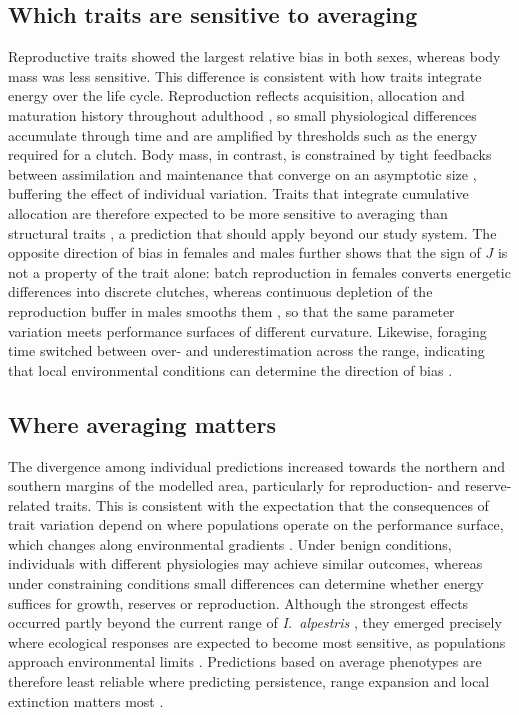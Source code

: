 \documentclass[12pt]{article}
\begin{document}
\subsection*{Which traits are sensitive to averaging}

Reproductive traits showed the largest relative bias in both sexes, whereas body mass was less sensitive. This difference is consistent with how traits integrate energy over the life cycle. Reproduction reflects acquisition, allocation and maturation history throughout adulthood \parencite{kooijman2010,jusup2017}, so small physiological differences accumulate through time and are amplified by thresholds such as the energy required for a clutch. Body mass, in contrast, is constrained by tight feedbacks between assimilation and maintenance that converge on an asymptotic size \parencite{nisbet2012,lika2019}, buffering the effect of individual variation. Traits that integrate cumulative allocation are therefore expected to be more sensitive to averaging than structural traits \parencite{nisbet2012,palmer2024}, a prediction that should apply beyond our study system. The opposite direction of bias in females and males further shows that the sign of $J$ is not a property of the trait alone: batch reproduction in females converts energetic differences into discrete clutches, whereas continuous depletion of the reproduction buffer in males smooths them \parencite{pecquerie2009,muller2019}, so that the same parameter variation meets performance surfaces of different curvature. Likewise, foraging time switched between over- and underestimation across the range, indicating that local environmental conditions can determine the direction of bias \parencite{martin2008}.

\subsection*{Where averaging matters}

The divergence among individual predictions increased towards the northern and southern margins of the modelled area, particularly for reproduction- and reserve-related traits. This is consistent with the expectation that the consequences of trait variation depend on where populations operate on the performance surface, which changes along environmental gradients \parencite{laughlin2015,li2021,ross2023,polazzo2024}. Under benign conditions, individuals with different physiologies may achieve similar outcomes, whereas under constraining conditions small differences can determine whether energy suffices for growth, reserves or reproduction. Although the strongest effects occurred partly beyond the current range of \emph{I.~alpestris} \parencite{iucn2021}, they emerged precisely where ecological responses are expected to become most sensitive, as populations approach environmental limits \parencite{holt2003,sexton2009,valladares2014}. Predictions based on average phenotypes are therefore least reliable where predicting persistence, range expansion and local extinction matters most \parencite{demarche2019}.
\end{document}
